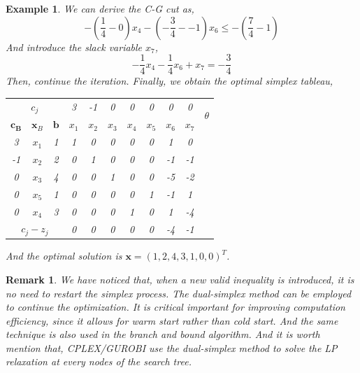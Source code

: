 \documentclass{article}
\newtheorem{example}{Example}
\newtheorem{remark}{Remark}
\begin{document}
\begin{example}
  	We can derive the C-G cut as,
  	\begin{equation}
  		-(\frac{1}{4} - 0)x_4 - (-\frac{3}{4} - -1)x_6 \leq -(\frac{7}{4} - 1)
  	\end{equation}
  	And introduce the slack variable $x_7$,
  	\begin{equation}
  		-\frac{1}{4} x_4 - \frac{1}{4}x_6 + x_7 = -\frac{3}{4}
  	\end{equation}
   Then, continue the iteration. Finally, we obtain the optimal simplex tableau,
   	\begin{table}[htbp]
	   	\centering
	   	\begin{tabular}{@{}ccccccccccc@{}}
	   		\toprule
	   		\multicolumn{3}{c}{$c_j$}      & 3       & -1    & 0    & 0    & 0      &  0     &  0   & \multirow{2}{*}{$\theta$} \\ \cmidrule(r){1-10}
	   		$\bm{c_B}$     & $\bm{x}_B$     & $\bm{b}$       & $x_1$    & $x_2$ & $x_3$ & $x_4$ & $x_5$ & $x_6$ &     $x_7$  &           \\ \midrule
	   		3        & $x_1$     & 1      & 1         & 0      & 0    & 0        & 0     &   1       &      0      &        \\
	   		-1        & $x_2$     & 2      & 0        & 1      & 0    & 0    & 0     &  -1  &    -1     &         \\
	   		0        & $x_3$     & 4       & 0       & 0      & 1    & 0    & 0     &  -5   &    -2    &          \\ 
	   		0       & $x_5$      &  1         &   0   &  0    & 0     & 0    & 1     &   -1   &    1    &    \\
	   		0       &  $x_4$      &  3       &   0    & 0     &  0    &    1      &   0    &  1     &   -4    &    \\ \midrule
	   		\multicolumn{3}{c}{$c_j-z_j$} & 0       & 0    & 0    & 0    & 0   &  -4   &     -1    &        \\  \bottomrule
	   	\end{tabular}%
   \end{table}

	And the optimal solution is $\bm{x} = (1, 2, 4, 3, 1, 0, 0)^T$.
\end{example}


\begin{remark}
	We have noticed that, when a new valid inequality is introduced, it is no need to restart the simplex process. The dual-simplex method can be employed to continue the optimization. It is critical important for improving computation efficiency, since it allows for warm start rather than cold start. And the same technique is also used in the branch and bound algorithm. And it is worth mention that, CPLEX/GUROBI use the dual-simplex method to solve the LP relaxation at every nodes of the search tree.
\end{remark}
\end{document}
